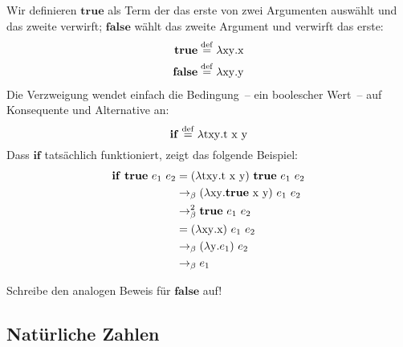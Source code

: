 Wir definieren $\mathbf{true}$ als Term
der das erste von zwei Argumenten auswählt und das zweite verwirft;
$\mathbf{false}$ wählt das zweite
Argument und verwirft das erste:
%
\begin{align*}
  \mathbf{true} & \stackrel{\rm def}{=}{} \lambda \mathrm x \mathrm y.\mathrm x \\
  \mathbf{false} & \stackrel{\rm def}{=}{} \lambda \mathrm x \mathrm y.\mathrm y
\end{align*}
%
Die Verzweigung wendet einfach die Bedingung~-- ein boolescher Wert~--
auf Konsequente und Alternative an:
%
\begin{displaymath}
  \mathbf{if} \stackrel{\rm def}{=}{} \lambda \mathrm t \mathrm x \mathrm y.\mathrm t~\mathrm x~\mathrm y
\end{displaymath}
%
Dass $\mathbf{if}$ tatsächlich funktioniert,
zeigt das folgende Beispiel:
%
\begin{displaymath}
  \begin{split}
    \mathbf{if}~\mathbf{true}~e_1~e_2 & =
    (\lambda \mathrm t \mathrm x \mathrm y.\mathrm t~\mathrm x~\mathrm y)~\mathbf{true}~e_1~e_2
    \\
    & \rightarrow_\beta (\lambda \mathrm x \mathrm y.\mathbf{true}~\mathrm x~\mathrm y)~e_1~e_2\\
    & \rightarrow_\beta^2 \mathbf{true}~e_1~e_2\\
    & = (\lambda \mathrm x \mathrm y.\mathrm x)~e_1~e_2\\
    & \rightarrow_\beta (\lambda \mathrm y.e_1)~e_2\\
    & \rightarrow_\beta e_1  \end{split}
\end{displaymath}
%
\begin{aufgabeinline}
  Schreibe den analogen Beweis für $\mathbf{false}$ auf!
\end{aufgabeinline}

\subsection{Natürliche Zahlen}

